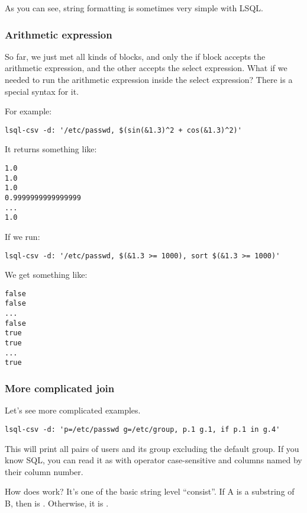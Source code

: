 As you can see, string formatting is sometimes very simple with LSQL.

\subsubsection{Arithmetic expression}
So far, we just met all kinds of blocks, and only the if block accepts the arithmetic expression, and the other accepts the select expression.
What if we needed to run the arithmetic expression inside the select expression? There is a special syntax \icode{\$(\ldots{})} for it.

For example:
\begin{verbatim}
lsql-csv -d: '/etc/passwd, $(sin(&1.3)^2 + cos(&1.3)^2)'
\end{verbatim}

It returns something like:
\begin{verbatim}
1.0
1.0
1.0
0.9999999999999999
...
1.0
\end{verbatim}

If we run:
\begin{verbatim}
lsql-csv -d: '/etc/passwd, $(&1.3 >= 1000), sort $(&1.3 >= 1000)'
\end{verbatim}

We get something like:
\begin{verbatim}
false
false
...
false
true
true
...
true
\end{verbatim}

\subsubsection{More complicated join}
Let's see more complicated examples.
\begin{verbatim}
lsql-csv -d: 'p=/etc/passwd g=/etc/group, p.1 g.1, if p.1 in g.4'
\end{verbatim}
This will print all pairs of users and its group excluding the default group. 
If you know SQL, you can read it as  with operator  case-sensitive and columns named by their column number.

How does  work? It's one of the basic string level ``consist''. If A is a substring of B, then  is . Otherwise, it is .

